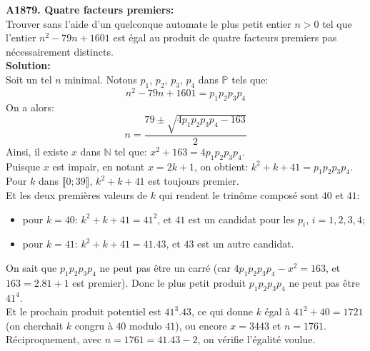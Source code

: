\documentclass[11pt] {article}
\newcommand{\N} {\mathbb{N}}
\newcommand{\PS} {\mathbb{P}}
\begin{document}



\textbf{A1879. Quatre facteurs premiers:}\\
Trouver sans l'aide d'un quelconque automate le plus petit entier $n > 0$ tel que l'entier $n^{2} - 79n + 1601$ est égal au produit de quatre facteurs premiers pas nécessairement distincts.\\

\textbf{Solution:}\\
Soit un tel $n$ minimal. Notons $p_{1}$, $p_{2}$, $p_{3}$, $p_{4}$ dans $\PS$ tels que: \[n^{2} - 79n + 1601 = p_{1}p_{2}p_{3}p_{4}\]
On a alors: \[n = \frac{79 \pm \sqrt{4p_{1}p_{2}p_{3}p_{4} - 163}}{2}\]
Ainsi, il existe $x$ dans $\N$ tel que: $x^{2} + 163 = 4p_{1}p_{2}p_{3}p_{4}$.\\

Puisque $x$ est impair, en notant $x = 2k+1$, on obtient: $k^{2} + k + 41 = p_{1}p_{2}p_{3}p_{4}$.\\
Pour $k$ dans $\llbracket 0; 39\rrbracket$, $k^{2} + k + 41$ est toujours premier.\\
Et les deux premières valeurs de $k$ qui rendent le trinôme composé sont $40$ et $41$:
\begin{itemize}
\item pour $k = 40$: $k^{2} + k + 41 = 41^{2}$, et $41$ est un candidat pour les $p_{i}$, $i = 1, 2, 3, 4$;
\item pour $k = 41$: $k^{2} + k + 41 = 41.43$, et $43$ est un autre candidat.\\
\end{itemize}

On sait que $p_{1}p_{2}p_{3}p_{4}$ ne peut pas être un carré (car $4p_{1}p_{2}p_{3}p_{4} - x^{2} = 163$, et $163 = 2.81 + 1$ est premier).
Donc le plus petit produit $p_{1}p_{2}p_{3}p_{4}$ ne peut pas être $41^{4}$.\\

Et le prochain produit potentiel est $41^{3}.43$, ce qui donne $k$ égal à $41^{2} + 40 = 1721$ (on cherchait $k$ congru à $40$ modulo $41$), ou encore $x = 3443$ et $n = 1761$.\\

Réciproquement, avec $n = 1761 = 41.43 - 2$, on vérifie l'égalité voulue.
\end{document}

